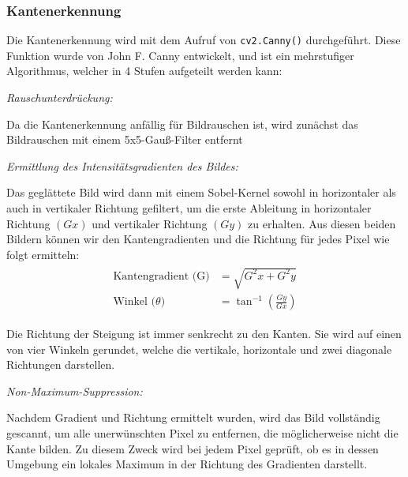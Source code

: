 \subsubsection{Kantenerkennung \label{sec:anpr:kantenerkennung}}
Die Kantenerkennung wird mit dem Aufruf von \verb|cv2.Canny()| durchgeführt. Diese Funktion wurde von John F. Canny entwickelt, und ist ein mehrstufiger Algorithmus, welcher in 4 Stufen aufgeteilt werden kann:
\begin{compactenum}
    \item \textit{Rauschunterdrückung: }
    \begin{compactenum}
        \item Da die Kantenerkennung anfällig für Bildrauschen ist, wird zunächst das Bildrauschen mit einem 5x5-Gauß-Filter entfernt
    \end{compactenum}
    \item \textit{Ermittlung des Intensitätsgradienten des Bildes: }
    \begin{compactenum}
        \item  Das geglättete Bild wird dann mit einem Sobel-Kernel sowohl in horizontaler als auch in vertikaler Richtung gefiltert, um die erste Ableitung in horizontaler Richtung \((Gx)\) und vertikaler Richtung \((Gy)\) zu erhalten. Aus diesen beiden Bildern können wir den Kantengradienten und die Richtung für jedes Pixel wie folgt ermitteln:
        \begin{equation}
            \begin{split}
                \begin{aligned}
                    \text{Kantengradient (G)} &= \sqrt{G^2x+G^2y}\\
                    \text{Winkel (\(\theta\))} &= \tan^{-1}(\frac{Gy}{Gx})
                \end{aligned}
            \end{split}
        \end{equation}
        \item Die Richtung der Steigung ist immer senkrecht zu den Kanten. Sie wird auf einen von vier Winkeln gerundet, welche die vertikale, horizontale und zwei diagonale Richtungen darstellen.
    \end{compactenum}
    \item \textit{Non-Maximum-Suppression: }
    \begin{compactenum}
        \item Nachdem Gradient und Richtung ermittelt wurden, wird das Bild vollständig gescannt, um alle unerwünschten Pixel zu entfernen, die möglicherweise nicht die Kante bilden. Zu diesem Zweck wird bei jedem Pixel geprüft, ob es in dessen Umgebung ein lokales Maximum in der Richtung des Gradienten darstellt.

\end{compactenum}
\end{compactenum}
